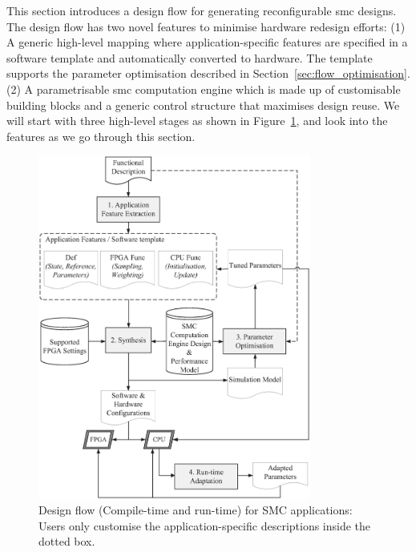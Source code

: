 This section introduces a design flow for generating reconfigurable \gls{smc} 
designs. The design flow has two novel features to minimise hardware redesign efforts:
(1) A generic high-level mapping where application-specific features are specified in a software template and automatically converted to hardware.
The template supports the parameter optimisation described in Section~\ref{sec:flow_optimisation}.
(2) A parametrisable \gls{smc} computation engine which is made up of customisable building blocks and a generic control structure that maximises design reuse.
We will start with three high-level stages as shown in Figure~\ref{fig:flow}, and look into the features as we go through this section.

\begin{figure}[ht]
\begin{center}
\includegraphics[width=0.8\textwidth]{5_tool/figures/flow}
\end{center}
\caption{Design flow (Compile-time and run-time) for SMC applications: Users only customise the application-specific descriptions inside the dotted box.}
\label{fig:flow}
\end{figure}

